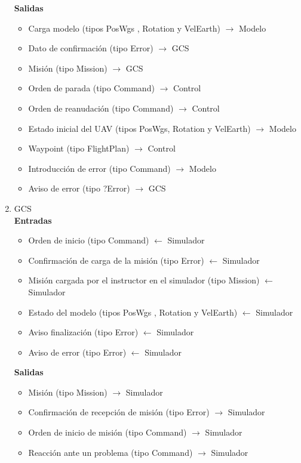 \documentclass[12pt,a4paper,spanish]{book} %
\begin{document}
\begin{enumerate}
\begin{itemize}
\end{itemize}

\textbf{Salidas}

\begin{itemize}
\item Carga modelo (tipos PosWgs , Rotation y VelEarth) $\rightarrow$ Modelo
\item Dato de confirmación (tipo Error) $\rightarrow$ GCS
\item Misión (tipo Mission) $\rightarrow$ GCS
\item Orden de parada (tipo Command) $\rightarrow$ Control
\item Orden de reanudación (tipo Command) $\rightarrow$ Control
\item Estado inicial del UAV (tipos PosWgs, Rotation y VelEarth) $\rightarrow$ Modelo
\item Waypoint (tipo FlightPlan) $\rightarrow$ Control
\item Introducción de error (tipo Command) $\rightarrow$ Modelo
\item Aviso de error (tipo ?Error) $\rightarrow$ GCS

\end{itemize}

\item GCS
\\
\textbf{Entradas}

\begin{itemize}

\item Orden de inicio (tipo Command) $\leftarrow$ Simulador
\item Confirmación de carga de la misión (tipo Error) $\leftarrow$ Simulador
\item Misión cargada por el instructor en el simulador (tipo Mission) $\leftarrow$ Simulador
\item Estado del modelo (tipos PosWgs , Rotation y VelEarth) $\leftarrow$ Simulador
\item Aviso finalización (tipo Error) $\leftarrow$ Simulador
\item Aviso de error (tipo Error) $\leftarrow$ Simulador

\end{itemize}

\textbf{Salidas}

\begin{itemize}

\item Misión (tipo Mission) $\rightarrow$ Simulador
\item Confirmación de recepción de misión (tipo Error) $\rightarrow$ Simulador
\item Orden de inicio de misión (tipo Command) $\rightarrow$ Simulador
\item Reacción ante un problema (tipo Command) $\rightarrow$ Simulador


\end{itemize}
\end{enumerate}
\end{document}
